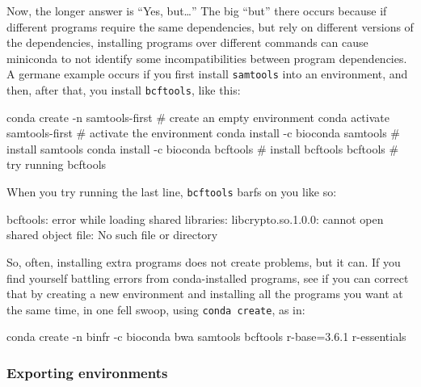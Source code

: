 \documentclass[]{krantz}
\makeatletter
\newenvironment{Shaded}{\begin{snugshade}}{\end{snugshade}}
\newcommand{\ExtensionTok}[1]{#1}
\newcommand{\NormalTok}[1]{#1}
\newenvironment{kframe}{%
\medskip{}
\setlength{\fboxsep}{.8em}
 \def\at@end@of@kframe{}%
 \ifinner\ifhmode%
  \def\at@end@of@kframe{\end{minipage}}%
  \begin{minipage}{\columnwidth}%
 \fi\fi%
 \def\FrameCommand##1{\hskip\@totalleftmargin \hskip-\fboxsep
 \colorbox{shadecolor}{##1}\hskip-\fboxsep
     \hskip-\linewidth \hskip-\@totalleftmargin \hskip\columnwidth}%
 \MakeFramed {\advance\hsize-\width
   \@totalleftmargin\z@ \linewidth\hsize
   \@setminipage}}%
 {\par\unskip\endMakeFramed%
 \at@end@of@kframe}
\renewenvironment{Shaded}{\begin{kframe}}{\end{kframe}}
\makeatother
\begin{document}
Now, the longer answer is ``Yes, but\ldots{}'' The big ``but'' there occurs because if different
programs require the same dependencies, but rely on different versions of the dependencies,
installing programs over different commands can cause miniconda to not identify some
incompatibilities between program dependencies. A germane example occurs if you first install
\texttt{samtools} into an environment, and then, after that, you install \texttt{bcftools}, like this:

\begin{Shaded}
\begin{Highlighting}[]
\ExtensionTok{conda}\NormalTok{ create -n samtools-first        # create an empty environment}
\ExtensionTok{conda}\NormalTok{ activate samtools-first         # activate the environment}
\ExtensionTok{conda}\NormalTok{ install -c bioconda samtools    # install samtools}
\ExtensionTok{conda}\NormalTok{ install -c bioconda bcftools    # install bcftools}
\ExtensionTok{bcftools}\NormalTok{                              # try running bcftools}
\end{Highlighting}
\end{Shaded}

When you try running the last line, \texttt{bcftools} barfs on you like so:

\begin{Shaded}
\begin{Highlighting}[]
\ExtensionTok{bcftools}\NormalTok{: error while loading shared libraries: libcrypto.so.1.0.0: cannot open shared object file: No such file or directory}
\end{Highlighting}
\end{Shaded}

So, often, installing extra programs does not create problems, but it can. If you find yourself battling
errors from conda-installed programs, see if you can correct that by creating a new environment and installing all the programs
you want at the same time, in one fell swoop, using \texttt{conda\ create}, as in:

\begin{Shaded}
\begin{Highlighting}[]
\ExtensionTok{conda}\NormalTok{ create -n binfr -c bioconda bwa samtools bcftools r-base=3.6.1 r-essentials}
\end{Highlighting}
\end{Shaded}

\hypertarget{exporting-environments}{%
\subsubsection{Exporting environments}\label{exporting-environments}}
\end{document}
